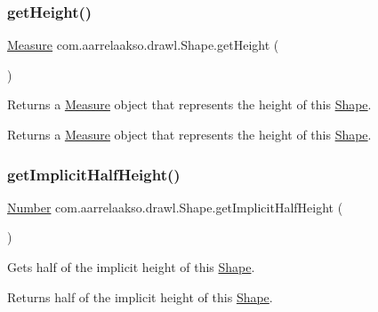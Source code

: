 \subsubsection{\texorpdfstring{get\+Height()}{getHeight()}}
{\footnotesize\ttfamily \hyperlink{classcom_1_1aarrelaakso_1_1drawl_1_1_measure}{Measure} com.\+aarrelaakso.\+drawl.\+Shape.\+get\+Height (\begin{DoxyParamCaption}{ }\end{DoxyParamCaption})}



Returns a \hyperlink{classcom_1_1aarrelaakso_1_1drawl_1_1_measure}{Measure} object that represents the height of this \hyperlink{classcom_1_1aarrelaakso_1_1drawl_1_1_shape}{Shape}. 

\begin{DoxyReturn}{Returns}
a \hyperlink{classcom_1_1aarrelaakso_1_1drawl_1_1_measure}{Measure} object that represents the height of this \hyperlink{classcom_1_1aarrelaakso_1_1drawl_1_1_shape}{Shape}. 
\end{DoxyReturn}
\mbox{\label{classcom_1_1aarrelaakso_1_1drawl_1_1_shape_a4af0fd7e309ea01bced73076510ef897}} 
\subsubsection{\texorpdfstring{get\+Implicit\+Half\+Height()}{getImplicitHalfHeight()}}
{\footnotesize\ttfamily \hyperlink{interfacecom_1_1aarrelaakso_1_1drawl_1_1_number}{Number} com.\+aarrelaakso.\+drawl.\+Shape.\+get\+Implicit\+Half\+Height (\begin{DoxyParamCaption}{ }\end{DoxyParamCaption})\hspace{0.3cm}{\ttfamily [protected]}}



Gets half of the implicit height of this \hyperlink{classcom_1_1aarrelaakso_1_1drawl_1_1_shape}{Shape}. 

\begin{DoxyReturn}{Returns}
half of the implicit height of this \hyperlink{classcom_1_1aarrelaakso_1_1drawl_1_1_shape}{Shape}. 
\end{DoxyReturn}
\mbox{\label{classcom_1_1aarrelaakso_1_1drawl_1_1_shape_a02d73887a309bcd1178b142ad0c7edd9}} 
